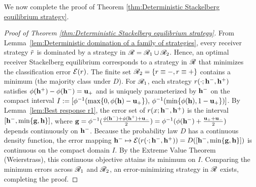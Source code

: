 We now complete the proof of Theorem \ref{thm:Deterministic Stackelberg equilibrium strategy}.

\begin{proof}[Proof of Theorem \ref{thm:Deterministic Stackelberg equilibrium strategy}]\label{proof:Deterministic Stackelberg equilibrium strategy}
	From Lemma~\ref{lem:Deterministic domination of a family of strategies}, every receiver strategy $\tilde{r}$ is dominated by a strategy in $\mathscr{R} = \mathscr{R}_1 \cup \mathscr{R}_2$. Hence, an optimal receiver Stackelberg equilibrium corresponds to a strategy in $\mathscr{R}$ that minimizes the classification error $\mathcal{E}(r)$. 
	The finite set $\mathscr{R}_2 = \{r \equiv \mathbf{-}, r \equiv \mathbf{+}\}$ contains a minimum (the majority class under $D$).
	For $\mathscr{R}_1$, each strategy $r(\cdot; \mathbf{h^{-}}, \mathbf{h^{+}})$ satisfies $\phi(\mathbf{h^{+}}) - \phi(\mathbf{h^{-}}) = \mathbf{u_+}$ and is uniquely parameterized by $\mathbf{h^{-}}$ on the compact interval $I := [\phi^{-1}(\max\{0, \phi(\mathbf{h}) - \mathbf{u_+}\}),\, \phi^{-1}(\min\{\phi(\mathbf{h}), 1 - \mathbf{u_+}\})]$. 
	By Lemma~\ref{lem:Best response r1}, the error set of $r(x; \mathbf{h^{-}}, \mathbf{h^{+}})$ is the interval $[\mathbf{h^{-}}, \min\{\mathbf{g}, \mathbf{h}\}]$, where $\mathbf{g} = \phi^{-1}(\frac{\phi(\mathbf{h^{-}}) + \phi(\mathbf{h^{+}}) + \mathbf{u_-}}{2}) = \phi^{-1}(\phi(\mathbf{h^{-}}) + \frac{\mathbf{u_+} + \mathbf{u_-}}{2})$ depends continuously on $\mathbf{h^{-}}$.
	Because the probability law $D$ has a continuous density function, the error mapping $\mathbf{h^{-}} \mapsto \mathcal{E}(r(\cdot; \mathbf{h^{-}}, \mathbf{h^{+}})) = D([\mathbf{h^{-}}, \min\{\mathbf{g}, \mathbf{h}\}])$ is continuous on the compact domain $I$. 
	By the Extreme Value Theorem (Weierstrass), this continuous objective attains its minimum on $I$. 
	Comparing the minimum errors across $\mathscr{R}_1$ and $\mathscr{R}_2$, an error-minimizing strategy in $\mathscr{R}$ exists, completing the proof.
\end{proof}

